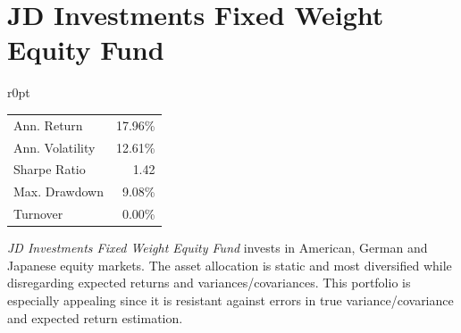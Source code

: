\documentclass[11pt, parskip=full, DIV=14, headings=small, footsepline, footinclude=false, headsepline]{scrreprt}
\let\oldcenter\center
\let\oldendcenter\endcenter
\renewenvironment{center}{\setlength\topsep{6pt}\oldcenter}{\oldendcenter}
\begin{document}
\newpage\section{JD Investments Fixed Weight Equity Fund}
\begin{mywraptable}{r}{0pt}
\begin{tabular}{lr}
\toprule
Ann. Return & 17.96\%\\
Ann. Volatility & 12.61\%\\
Sharpe Ratio & 1.42 \\
Max. Drawdown & 9.08\%\\
Turnover & 0.00\%\\
\bottomrule
\end{tabular}
\end{mywraptable}
\textit{JD Investments Fixed Weight Equity Fund} invests in American, German and Japanese equity markets. The asset allocation is static and most diversified while disregarding expected returns and variances/covariances. This portfolio is especially appealing since it is resistant against errors in true variance/covariance and expected return estimation.


\begin{center}
\end{center}
\end{document}
